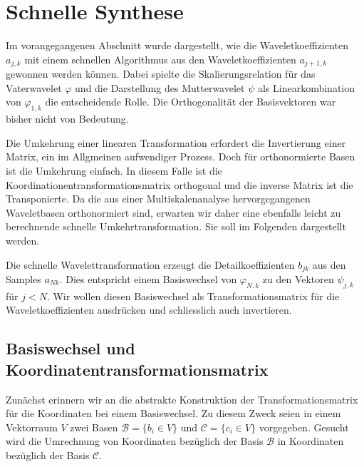 %
%
%
\section{Schnelle Synthese\label{section:schnelle-synthese}}
Im vorangegangenen Abschnitt wurde dargestellt, wie die Waveletkoeffizienten
$a_{j,k}$ mit einem schnellen Algorithmus aus den Waveletkoeffizienten
$a_{j+1,k}$ gewonnen werden können.
Dabei spielte die Skalierungsrelation für das Vaterwavelet $\varphi$ und die
Darstellung des Mutterwavelet $\psi$ als Linearkombination von $\varphi_{1,k}$
die entscheidende Rolle.
Die Orthogonalität der Basisvektoren war bisher nicht von Bedeutung.

Die Umkehrung einer linearen Transformation erfordert die
Invertierung einer Matrix, ein im Allgmeinen aufwendiger Prozess.
Doch für orthonormierte Basen ist die Umkehrung einfach.
In diesem Falle ist die Koordinationentransformationsmatrix
orthogonal und die inverse Matrix ist die Transponierte.
Da die aus einer Multiskalenanalyse hervorgegangenen Waveletbasen
orthonormiert sind, erwarten wir daher eine ebenfalls leicht zu
berechnende schnelle Umkehrtransformation.
Sie soll im Folgenden dargestellt werden.

Die schnelle Wavelettransformation erzeugt die Detailkoeffizienten
$b_{jk}$ aus den Samples $a_{Nk}$.
Dies entspricht einem Basiswechsel von $\varphi_{N,k}$ zu den
Vektoren $\psi_{j,k}$ für $j<N$.
Wir wollen diesen Basiswechsel als Transformationsmatrix für 
die Waveletkoeffizienten ausdrücken und schliesslich auch invertieren.

%
%
\subsection{Basiswechsel und Koordinatentransformationsmatrix}
Zunächst erinnern wir an die abstrakte Konstruktion der
Transformationsmatrix für die Koordinaten bei einem Basiswechsel.
Zu diesem Zweck seien in einem Vektorraum $V$ zwei Basen
$\mathcal{B}=\{b_i\in V\}$ und $\mathcal{C}=\{c_i\in V\}$ vorgegeben.
Gesucht wird die Umrechnung von Koordinaten bezüglich der Basis
$\mathcal{B}$ in Koordinaten bezüglich der Basis $\mathcal{C}$.

